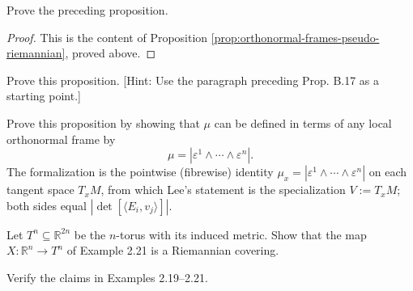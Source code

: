 \begin{exercise}
\label{exer:prove-orthonormal-frames}

Prove the preceding proposition.
\end{exercise}
\begin{proof}

This is the content of Proposition \ref{prop:orthonormal-frames-pseudo-riemannian}, proved above.
\end{proof}

\begin{exercise}
\label{exer:prove-outward-normal}
Prove this proposition. [Hint: Use the paragraph preceding Prop. B.17 as a starting point.]
\end{exercise}

\begin{exercise}
\label{exer:prove-prop-247}

\end{exercise}

\begin{exercise}\label{exer:riemannian-density-formula}


Prove this proposition by showing that $\mu$ can be defined in terms of any local orthonormal frame by
\[
\mu = |\varepsilon^1 \wedge \cdots \wedge \varepsilon^n|.
\]
The formalization is the pointwise (fibrewise) identity $\mu_x = |\varepsilon^1 \wedge \cdots \wedge \varepsilon^n|$ on each tangent space $T_xM$, from which Lee's statement is the specialization $V := T_xM$; both sides equal $|\det[\langle E_i, v_j\rangle]|$.
\end{exercise}

\begin{exercise}
\label{exer:torus-covering}
Let $T^n \subseteq \mathbb{R}^{2n}$ be the $n$-torus with its induced metric. Show that the map $X: \mathbb{R}^n \to T^n$ of Example 2.21 is a Riemannian covering.
\end{exercise}

\begin{exercise}
\label{exer:verify-surface-revolution-examples}

Verify the claims in Examples 2.19–2.21.
\end{exercise}

